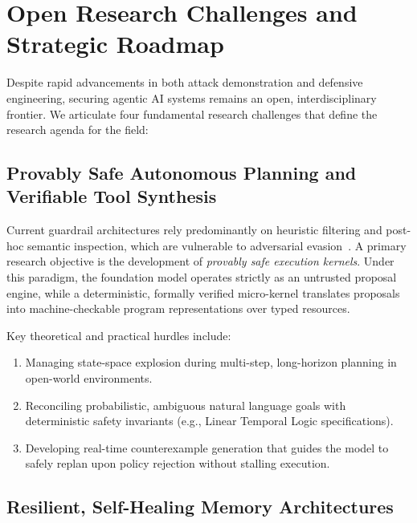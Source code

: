 \section{Open Research Challenges and Strategic Roadmap}
\label{sec:open_challenges}

Despite rapid advancements in both attack demonstration and defensive engineering, securing agentic AI systems remains an open, interdisciplinary frontier. We articulate four fundamental research challenges that define the research agenda for the field:

\subsection{Provably Safe Autonomous Planning and Verifiable Tool Synthesis}
\label{subsec:provable_planning}

Current guardrail architectures rely predominantly on heuristic filtering and post-hoc semantic inspection, which are vulnerable to adversarial evasion~\cite{chen2025struq}. A primary research objective is the development of \textit{provably safe execution kernels}. Under this paradigm, the foundation model operates strictly as an untrusted proposal engine, while a deterministic, formally verified micro-kernel translates proposals into machine-checkable program representations over typed resources. 

Key theoretical and practical hurdles include:
\begin{enumerate}
    \item Managing state-space explosion during multi-step, long-horizon planning in open-world environments.
    \item Reconciling probabilistic, ambiguous natural language goals with deterministic safety invariants (e.g., Linear Temporal Logic specifications).
    \item Developing real-time counterexample generation that guides the model to safely replan upon policy rejection without stalling execution.
\end{enumerate}

\subsection{Resilient, Self-Healing Memory Architectures}
\label{subsec:self_healing_memory}

